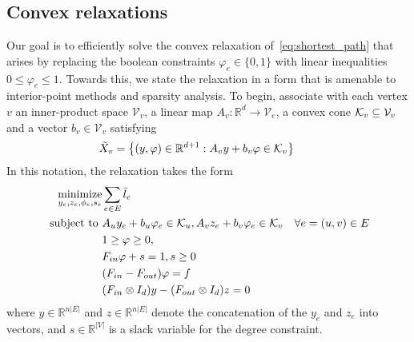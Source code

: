 \documentclass[letterpaper, 11pt]{article}
\begin{document}
\subsection{Convex relaxations}
Our goal is to efficiently solve the convex relaxation of~\eqref{eq:shortest_path}
that arises by replacing the boolean constraints $\varphi_e \in \{0, 1\}$ 
with linear inequalities $0 \le \varphi_e \le 1$. Towards this, we
state the relaxation in a form that is amenable to interior-point methods and sparsity 
analysis.   To begin, associate with each vertex $v$  an inner-product space $\mathcal{V}_v$,
a linear map $A_v : \mathbb{R}^{d} \rightarrow \mathcal{V}_e$, a
convex cone $\mathcal{K}_v \subseteq \mathcal{V}_v$ and a vector $b_v \in \mathcal{V}_v$ satisfying
\[
  \tilde X_v = \left\{ (y, \varphi) \in \mathbb{R}^{d+1} : A_v y  + b_v \varphi \in \mathcal{K}_v  \right\} \qquad
\]
In this notation, the relaxation takes the form
\begin{align}~\label{cp:coneRelax}
  \begin{aligned}
    \operatorname*{minimize}_{y_e, z_e, \phi_e, s_e} & \sum_{e \in E}\tilde l_e\\
    \mbox{subject to } &A_u y_e + b_u \varphi_e \in \mathcal{K}_u ,  A_v z_e + b_v \varphi_e \in \mathcal{K}_v  & \forall e = (u, v) \in E \\
                      & 1 \ge \varphi \ge 0,  \\
                      & F_{in} \varphi  + s   = 1, s \ge 0\\
                      & (F_{in} - F_{out}) \varphi  = f\\
                      & (F_{in} \otimes I_d)  y - (F_{out} \otimes I_d) z  = 0\\
  \end{aligned}
\end{align}
where $y \in \mathbb{R}^{ n |E|} $ and $z \in \mathbb{R}^{ n |E|}$ denote the concatenation of the $y_e$ and $z_e$
into vectors, and $s \in \mathbb{R}^{|V|}$ is a slack variable for the degree constraint. 
\end{document}

